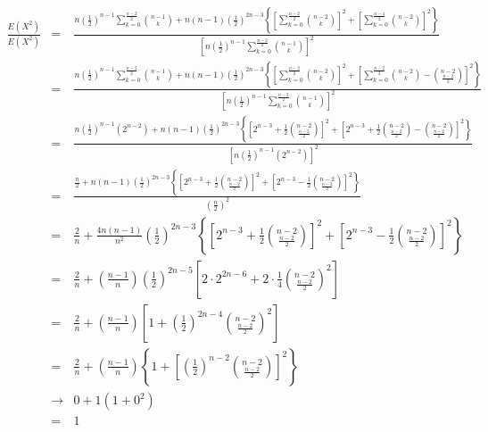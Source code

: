 \documentclass[letterpaper,12pt,fleqn]{article}
\begin{document}
\begin{enumerate}
\begin{description}
\footnotesize\begin{eqnarray*}
\frac{E(X^2)}{E(X^2)}
&=& \frac{n\left(\frac{1}{2}\right)^{n-1}\sum_{k=0}^{\frac{n-2}{2}}\binom{n-1}{k}+
    n(n-1)\left(\frac{1}{2}\right)^{2n-3}\left\{
    \left[\sum_{k=0}^{\frac{n-2}{2}}\binom{n-2}{k}\right]^2+
    \left[\sum_{k=0}^{\frac{n-4}{2}}\binom{n-2}{k}\right]^2\right\}}
    {\left[n\left(\frac{1}{2}\right)^{n-1}\sum_{k=0}^{\frac{n-2}{2}}\binom{n-1}{k}
    \right]^2} \\
&=& \frac{n\left(\frac{1}{2}\right)^{n-1}\sum_{k=0}^{\frac{n-2}{2}}\binom{n-1}{k}+
    n(n-1)\left(\frac{1}{2}\right)^{2n-3}\left\{
    \left[\sum_{k=0}^{\frac{n-2}{2}}\binom{n-2}{k}\right]^2+
    \left[\sum_{k=0}^{\frac{n-2}{2}}\binom{n-2}{k}-
    \binom{n-2}{\frac{n-2}{2}}\right]^2\right\}}
    {\left[
    n\left(\frac{1}{2}\right)^{n-1}\sum_{k=0}^{\frac{n-2}{2}}\binom{n-1}{k}
    \right]^2} \\
&=& \frac{n\left(\frac{1}{2}\right)^{n-1}\left(2^{n-2}\right)+
    n(n-1)\left(\frac{1}{2}\right)^{2n-3}\left\{
    \left[2^{n-3}+\frac{1}{2}\binom{n-2}{\frac{n-2}{2}}\right]^2+
    \left[2^{n-3}+\frac{1}{2}\binom{n-2}{\frac{n-2}{2}}-
    \binom{n-2}{\frac{n-2}{2}}\right]^2\right\}}
    {\left[n\left(\frac{1}{2}\right)^{n-1}\left(2^{n-2}\right)\right]^2} \\
&=& \frac{\frac{n}{2}+n(n-1)\left(\frac{1}{2}\right)^{2n-3}\left\{
    \left[2^{n-3}+\frac{1}{2}\binom{n-2}{\frac{n-2}{2}}\right]^2+
    \left[2^{n-3}-\frac{1}{2}\binom{n-2}{\frac{n-2}{2}}\right]^2\right\}}
    {\left(\frac{n}{2}\right)^2} \\
&=& \frac{2}{n}+\frac{4n(n-1)}{n^2}\left(\frac{1}{2}\right)^{2n-3}\left\{
    \left[2^{n-3}+\frac{1}{2}\binom{n-2}{\frac{n-2}{2}}\right]^2+
    \left[2^{n-3}-\frac{1}{2}\binom{n-2}{\frac{n-2}{2}}\right]^2\right\} \\
&=& \frac{2}{n}+\left(\frac{n-1}{n}\right)\left(\frac{1}{2}\right)^{2n-5}\left[
    2\cdot2^{2n-6}+2\cdot\frac{1}{4}\binom{n-2}{\frac{n-2}{2}}^2\right] \\
&=& \frac{2}{n}+\left(\frac{n-1}{n}\right)\left[1+
    \left(\frac{1}{2}\right)^{2n-4}\binom{n-2}{\frac{n-2}{2}}^2\right] \\
&=& \frac{2}{n}+\left(\frac{n-1}{n}\right)\left\{1+
    \left[\left(\frac{1}{2}\right)^{n-2}\binom{n-2}{\frac{n-2}{2}}\right]^2
    \right\} \\
&\to& 0+1(1+0^2) \\
&=& 1 \\
\end{eqnarray*}
\normalsize


\end{description}
\end{enumerate}
\end{document}
